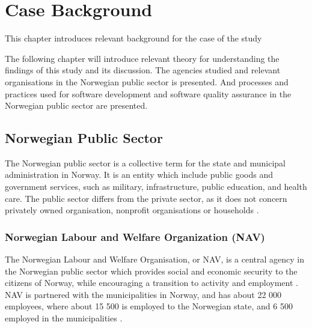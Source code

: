 \chapter{Case Background}
This chapter introduces relevant background for the case of the study

The following chapter will introduce relevant theory for understanding the findings of this study and its discussion. The agencies studied and relevant organisations in the Norwegian public sector is presented. And processes and practices used for software development and software quality assurance in the Norwegian public sector are presented. 

\section{Norwegian Public Sector}
The Norwegian public sector is a collective term for the state and municipal administration in Norway. It is an entity which include public goods and government services, such as military, infrastructure, public education, and health care. The public sector differs from the private sector, as it does not concern privately owned organisation, nonprofit organisations or households \cite{os_snl_2022}\cite{ps_wiki_2023}.

\subsection{Norwegian Labour and Welfare Organization (NAV)}
The Norwegian Labour and Welfare Organisation, or NAV, is a central agency in the Norwegian public sector which provides social and economic security to the citizens of Norway, while encouraging a transition to activity and employment \cite{nav_r_2023}. NAV is partnered with the municipalities in Norway, and has about 22 000 employees, where about 15 500 is employed to the Norwegian state, and 6 500 employed in the municipalities \cite{org_nav_2023}. 


